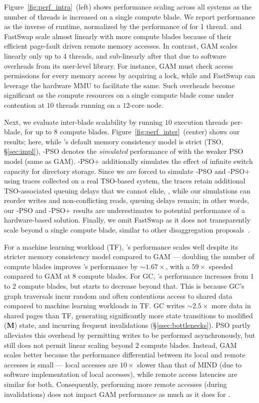  Figure~\ref{fig:perf_intra}~(left) shows performance scaling across all systems as the number of threads is increased on a single compute blade. We report performance as the inverse of runtime, normalized by the performance of \mind for 1 thread. \mind and FastSwap scale almost linearly with more compute blades because of their efficient page-fault driven remote memory accesses. In contrast, GAM scales linearly only up to 4 threads, and sub-linearly after that due to software overheads from its user-level library. For instance, GAM must check access permissions for every memory access by acquiring a lock, while \mind and FastSwap can leverage the hardware MMU to facilitate the same. Such overheads become significant as the compute resources on a single compute blade come under contention at $10$ threads running on a $12$-core node. 

 Next, we evaluate inter-blade scalability by running $10$ execution threads per-blade, for up to $8$ compute blades. Figure~\ref{fig:perf_inter}~(center) shows our results; here, while \mind's default memory consistency model is strict (TSO, \S\ref{sec:impl}), \mind-PSO denotes the \textit{simulated} performance of \mind with the weaker PSO model (same as GAM). \mind-PSO$+$ additionally simulates the effect of infinite switch capacity for directory storage. Since we are forced to simulate \mind-PSO and \mind-PSO$+$ using traces collected on a real TSO-based system, the traces retain additional TSO-associated queuing delays that we cannot elide, \ie, while our simulations can reorder writes and non-conflicting reads, queuing delays remain; in other words, our \mind-PSO and \mind-PSO$+$ results are underestimates to potential performance of a hardware-based solution. Finally, we omit FastSwap as it does not transparently scale beyond a single compute blade, similar to other disaggregation proposals~\cite{legoos, infiniswap}.

For a machine learning workload (TF), \mind's performance scales well despite its stricter memory consistency model compared to GAM --- doubling the number of compute blades improves \mind's performance by ${\sim} 1.67\times$, with a $59 \times$ speeded compared to GAM at $8$ compute blades. For GC, \mind's performance increases from $1$ to $2$ compute blades, but starts to decrease beyond that. This is because GC's graph traversals incur random and often contentious access to shared data compared to machine learning workloads in TF. GC writes ${\sim} 2.5\times$ more data in shared pages than TF, generating significantly more state transitions to modified (\textbf{M}) state, and incurring frequent invalidations (\S\ref{ssec:bottlenecks}). PSO partly alleviates this overhead by permitting writes to be performed asynchronously, but still does not permit linear scaling beyond $2$ compute blades. Instead, GAM scales better because the performance differential between its local and remote accesses is small --- local accesses are $10\times$ slower than that of MIND (due to software implementation of local accesses), while remote access latencies are similar for both. Consequently, performing more remote accesses (during invalidations) does not impact GAM performance as much as it does for \mind.

